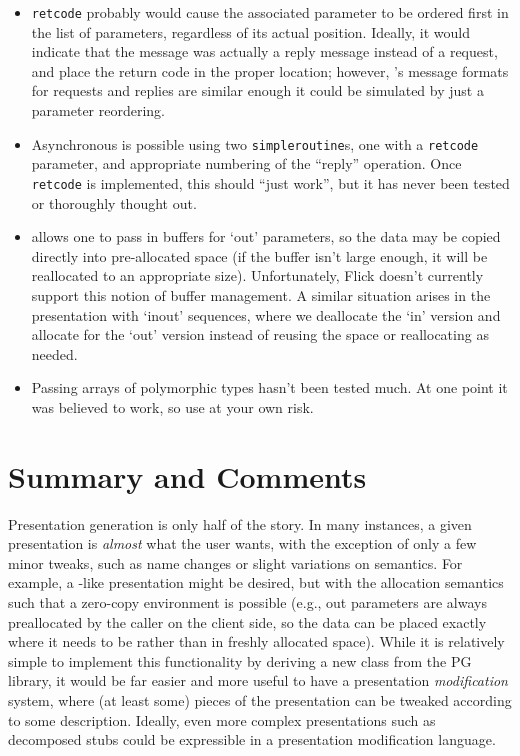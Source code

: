 \begin{itemize}
  \item \texttt{retcode} probably would cause the associated parameter to be
  ordered first in the list of parameters, regardless of its actual position.
  Ideally, it would indicate that the message was actually a reply message
  instead of a request, and place the return code in the proper location;
  however, \MIG{}'s message formats for requests and replies are similar enough
  it could be simulated by just a parameter reordering.

  \item Asynchronous \RPC{} is possible using two \texttt{simpleroutine}s, one
  with a \texttt{retcode} parameter, and appropriate numbering of the ``reply''
  operation.  Once \texttt{retcode} is implemented, this should ``just work'',
  but it has never been tested or thoroughly thought out.

  \item \MIG{} allows one to pass in buffers for `out' parameters, so the data
  may be copied directly into pre-allocated space (if the buffer isn't large
  enough, it will be reallocated to an appropriate size).  Unfortunately, Flick
  doesn't currently support this notion of buffer management.  A similar
  situation arises in the \CORBA{} presentation with `inout' sequences, where
  we deallocate the `in' version and allocate for the `out' version instead of
  reusing the space or reallocating as needed.

  \item Passing arrays of polymorphic types hasn't been tested much.  At one
  point it was believed to work, so use at your own risk.
\end{itemize}



\section{Summary and Comments}
\label{sec:PG:Summary and Comments}

Presentation generation is only half of the story.  In many instances, a given
presentation is \emph{almost} what the user wants, with the exception of only a
few minor tweaks, such as name changes or slight variations on semantics.  For
example, a \CORBA{}-like presentation might be desired, but with the allocation
semantics such that a zero-copy environment is possible (e.g., out parameters
are always preallocated by the caller on the client side, so the data can be
placed exactly where it needs to be rather than in freshly allocated space).
While it is relatively simple to implement this functionality by deriving a new
class from the \CORBA{} PG library, it would be far easier and more useful to
have a presentation \emph{modification} system, where (at least some) pieces of
the presentation can be tweaked according to some description.  Ideally, even
more complex presentations such as decomposed stubs could be expressible in a
presentation modification language.

